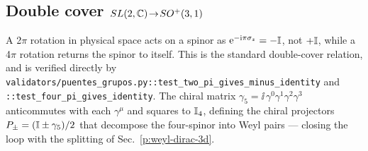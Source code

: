 \subsection{Double cover $SL(2,\mathbb{C})\!\to\!SO^{+}(3,1)$}
A 2$\pi$ rotation in physical space acts on a spinor as
$\mathrm{e}^{-\mathrm{i}\pi\sigma_{z}} = -\mathbb{I}$, not $+\mathbb{I}$, while a 4$\pi$
rotation returns the spinor to itself. This is the standard double-cover
relation, and is verified directly by
\texttt{validators/puentes\_grupos.py::test\_two\_pi\_gives\_minus\_identity}
and \texttt{::test\_four\_pi\_gives\_identity}. The chiral matrix
$\gamma_{5} = \ii\,\gamma^{0}\gamma^{1}\gamma^{2}\gamma^{3}$ anticommutes
with each $\gamma^{\mu}$ and squares to $\mathbb{I}_{4}$, defining the chiral
projectors $P_{\pm}=(\mathbb{I}\pm\gamma_{5})/2$ that decompose the four-spinor
into Weyl pairs --- closing the loop with the splitting of
Sec.~\ref{p:weyl-dirac-3d}.
